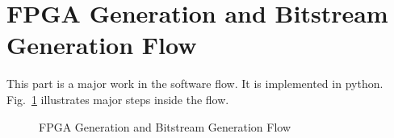 \section{FPGA Generation and Bitstream Generation Flow}
\label{sec:fg_bg_flow}

This part is a major work in the software flow. It is implemented in python. Fig.~\ref{fig:fp_bg_flow} illustrates
major steps inside the flow.

\begin{figure}[htp]
	\begin{center}
		\epsfxsize=5.0in
		    \renewcommand{\captionfont}{\small}
				\caption{FPGA Generation and Bitstream Generation Flow
				\label{fig:fp_bg_flow}}
	\end{center}
\end{figure}